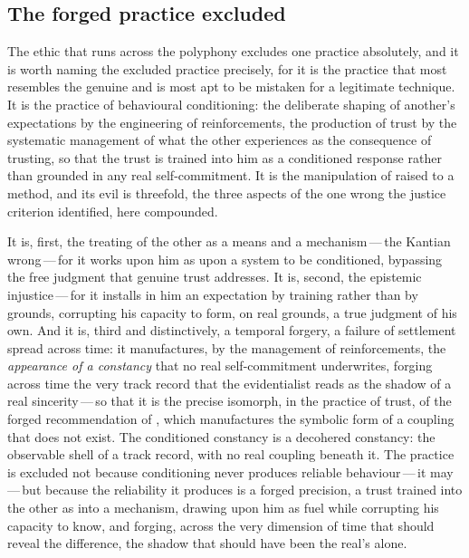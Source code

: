 \subsection{The forged practice excluded}
\label{p13:sub:prax-forged}

The ethic that runs across the polyphony excludes one practice absolutely, and it is worth naming the excluded practice precisely, for it is the practice that most resembles the genuine and is most apt to be mistaken for a legitimate technique. It is the practice of behavioural conditioning: the deliberate shaping of another's expectations by the engineering of reinforcements, the production of trust by the systematic management of what the other experiences as the consequence of trusting, so that the trust is trained into him as a conditioned response rather than grounded in any real self-commitment. It is the manipulation of  raised to a method, and its evil is threefold, the three aspects of the one wrong the justice criterion identified, here compounded.

It is, first, the treating of the other as a means and a mechanism\,---\,the Kantian wrong\,---\,for it works upon him as upon a system to be conditioned, bypassing the free judgment that genuine trust addresses. It is, second, the epistemic injustice\,---\,for it installs in him an expectation by training rather than by grounds, corrupting his capacity to form, on real grounds, a true judgment of his own. And it is, third and distinctively, a temporal forgery, a failure of settlement spread across time: it manufactures, by the management of reinforcements, the \emph{appearance of a constancy} that no real self-commitment underwrites, forging across time the very track record that the evidentialist reads as the shadow of a real sincerity\,---\,so that it is the precise isomorph, in the practice of trust, of the forged recommendation of , which manufactures the symbolic form of a coupling that does not exist. The conditioned constancy is a decohered constancy: the observable shell of a track record, with no real coupling beneath it. The practice is excluded not because conditioning never produces reliable behaviour\,---\,it may\,---\,but because the reliability it produces is a forged precision, a trust trained into the other as into a mechanism, drawing upon him as fuel while corrupting his capacity to know, and forging, across the very dimension of time that should reveal the difference, the shadow that should have been the real's alone.

